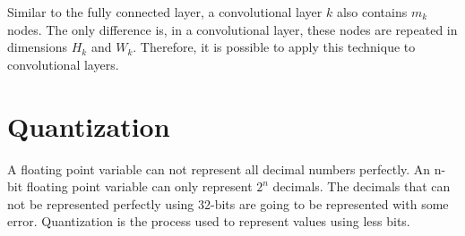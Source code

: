 Similar to the fully connected layer, a convolutional layer $k$ also contains $m_k$ nodes. The only difference is, in a convolutional layer, these nodes are repeated in dimensions $H_k$ and $W_k$. Therefore, it is possible to apply this technique to convolutional layers. 

\iffalse
\subsection{Activation Based Pruning - Fully Connected Layers} \label{sec:activation-based-pruning-convolution}
Activation based pruning, works by looking at individual values in layers, and prunes the layer and corresponding weight row/columns completely. To visualize this, we will assume that the fully connected layers we have defined are, trained to some extent, and activated using ReLU activations. With this definition, if we apply our dataset and count the number of activations in $\mathbf{l_1}$ and $\mathbf{l_2}$, we may realize that there are some neurons that are not being activated at all. By removing these neurons from the layers, we can reduce the number of operations. This removal operation is done by removing neurons based on their activations. 
\todoin{add figure to show what happens when we prune}

\subsection{Activation Based Pruning - Convolution and Deconvolutions}
\todoin{Put references for conv and deconv operations. }
In theory, convolution operation is a matrix multiplication applied on a sliding window. Thus, counting the output feature activations of a convolution operation, we can apply activation based pruning. 

\subsection{Second Order Derivatives (Fischer Information Matrix)}
\fi

\section{Quantization}
A floating point variable can not represent all decimal numbers perfectly. An n-bit floating point variable can only represent $2^{n}$ decimals. The decimals that can not be represented perfectly using 32-bits are going to be represented with some error. Quantization is the process used to represent values using less bits. 

